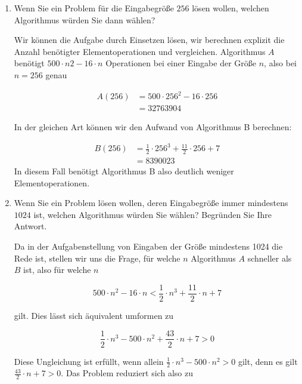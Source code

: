 \documentclass{bschlangaul-aufgabe}
\begin{document}
\begin{enumerate}


\item Wenn Sie ein Problem für die Eingabegröße $256$ lösen wollen,
welchen Algorithmus würden Sie dann wählen?

\begin{bAntwort}
Wir können die Aufgabe durch Einsetzen lösen, \dh wir berechnen explizit
die Anzahl benötigter Elementoperationen und vergleichen. Algorithmus
$A$ benötigt $500 \cdot n 2 -16 \cdot n$ Operationen bei einer Eingabe
der Größe $n$, also bei $n = 256$ genau

\begin{align*}
A(256)
&= 500 \cdot 256^2 - 16 \cdot 256 \\
&= 32763904
\end{align*}

In der gleichen Art können wir den Aufwand von Algorithmus B berechnen:

\begin{align*}
B(256)
&= \frac{1}{2} \cdot 256^3 + \frac{11}{2} \cdot 256 + 7 \\
&= 8390023
\end{align*}
In diesem Fall benötigt Algorithmus B also deutlich weniger Elementoperationen.
\end{bAntwort}


\item Wenn Sie ein Problem lösen wollen, deren Eingabegröße immer
mindestens $1024$ ist, welchen Algorithmus würden Sie wählen? Begründen
Sie Ihre Antwort.

\begin{bAntwort}
Da in der Aufgabenstellung von Eingaben der Größe mindestens 1024 die
Rede ist, stellen wir uns die Frage, für welche $n$ Algorithmus $A$
schneller als $B$ ist, also für welche $n$

\begin{displaymath}
500 \cdot n^2 - 16 \cdot n < \frac{1}{2} \cdot n^3 + \frac{11}{2} \cdot n + 7
\end{displaymath}

gilt. Dies lässt sich äquivalent umformen zu

\begin{displaymath}
\frac{1}{2} \cdot n^3 - 500 \cdot n^2 + \frac{43}{2} \cdot n + 7 > 0
\end{displaymath}

Diese Ungleichung ist erfüllt, wenn allein $\frac{1}{2} \cdot n^3 - 500
\cdot n^2 > 0$ gilt, denn es gilt $\frac{43}{2} \cdot n + 7 > 0$. Das
Problem reduziert sich also zu


\end{bAntwort}
\end{enumerate}
\end{document}
